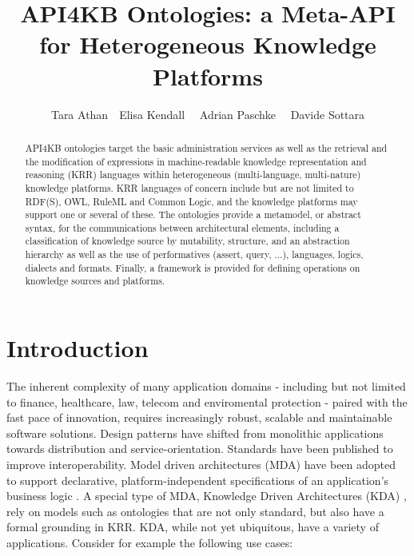 \documentclass[runningheads]{llncs}
\title{API4KB Ontologies: a Meta-API for Heterogeneous Knowledge Platforms}
\date{}
\begin{document}
%
\author{Tara Athan\ \ Elisa Kendall \ \ Adrian Paschke \ \ Davide Sottara}

%
\maketitle

\begin{abstract}
API4KB ontologies target the basic administration
services as well as the retrieval and the modification of expressions in machine-readable knowledge representation and reasoning (KRR) languages within heterogeneous (multi-language, multi-nature) knowledge platforms.
KRR languages of concern include but are not limited to RDF(S), OWL, RuleML and Common Logic, and the knowledge platforms may support one or several of these.
The ontologies provide a metamodel, or abstract syntax, for the communications between architectural elements, including a classification of knowledge source by mutability, structure, and an abstraction hierarchy as well as the use of performatives (assert, query, ...), languages, logics, dialects and formats. Finally, a framework is provided for defining operations on knowledge sources and platforms.
\end{abstract}

%

\section{Introduction}
The inherent complexity of many application domains \-- including but not limited to finance, healthcare, law, telecom and enviromental protection \-- paired with the fast pace of innovation, requires increasingly robust, scalable and maintainable software solutions. Design patterns have shifted from monolithic applications towards distribution and service-orientation. Standards have been published to improve interoperability. Model driven architectures (MDA) have been adopted to support declarative, platform-independent specifications of an application's business logic \cite{Mellor et al:2004}. A special type of MDA, Knowledge Driven Architectures (KDA) \cite{Rector:2010}, rely on models such as ontologies that are not only standard, but also have a formal grounding in KRR. 
KDA, while not yet ubiquitous, have a variety of applications. Consider for example the following use cases:
\end{document}
